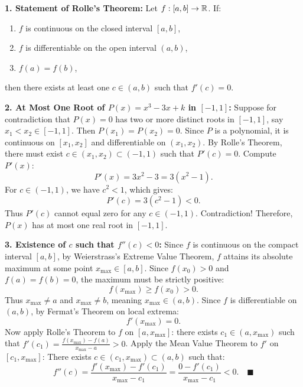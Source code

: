 \begin{solution}
\textbf{1. Statement of Rolle's Theorem:}
Let $f: [a, b] \to \mathbb{R}$. If:
\begin{enumerate}[leftmargin=1.5em,itemsep=1pt]
  \item $f$ is continuous on the closed interval $[a, b]$,
  \item $f$ is differentiable on the open interval $(a, b)$,
  \item $f(a) = f(b)$,
\end{enumerate}
then there exists at least one $c \in (a, b)$ such that $f'(c) = 0$.

\textbf{2. At Most One Root of $P(x) = x^3 - 3x + k$ in $[-1, 1]$:}
Suppose for contradiction that $P(x) = 0$ has two or more distinct roots in $[-1, 1]$, say $x_1 < x_2 \in [-1, 1]$.
Then $P(x_1) = P(x_2) = 0$.
Since $P$ is a polynomial, it is continuous on $[x_1, x_2]$ and differentiable on $(x_1, x_2)$.
By Rolle's Theorem, there must exist $c \in (x_1, x_2) \subset (-1, 1)$ such that $P'(c) = 0$.
Compute $P'(x)$:
\[
P'(x) = 3x^2 - 3 = 3(x^2 - 1).
\]
For $c \in (-1, 1)$, we have $c^2 < 1$, which gives:
\[
P'(c) = 3(c^2 - 1) < 0.
\]
Thus $P'(c)$ cannot equal zero for any $c \in (-1, 1)$.
Contradiction! Therefore, $P(x)$ has at most one real root in $[-1, 1]$.

\textbf{3. Existence of $c$ such that $f''(c) < 0$:}
Since $f$ is continuous on the compact interval $[a, b]$, by Weierstrass's Extreme Value Theorem, $f$ attains its absolute maximum at some point $x_{\max} \in [a, b]$.
Since $f(x_0) > 0$ and $f(a) = f(b) = 0$, the maximum must be strictly positive:
\[
f(x_{\max}) \ge f(x_0) > 0.
\]
Thus $x_{\max} \ne a$ and $x_{\max} \ne b$, meaning $x_{\max} \in (a, b)$.
Since $f$ is differentiable on $(a, b)$, by Fermat's Theorem on local extrema:
\[
f'(x_{\max}) = 0.
\]
Now apply Rolle's Theorem to $f$ on $[a, x_{\max}]$: there exists $c_1 \in (a, x_{\max})$ such that $f'(c_1) = \frac{f(x_{\max}) - f(a)}{x_{\max} - a} > 0$.
Apply the Mean Value Theorem to $f'$ on $[c_1, x_{\max}]$:
There exists $c \in (c_1, x_{\max}) \subset (a, b)$ such that:
\[
f''(c) = \frac{f'(x_{\max}) - f'(c_1)}{x_{\max} - c_1} = \frac{0 - f'(c_1)}{x_{\max} - c_1} < 0. \quad \blacksquare
\]
\end{solution}

